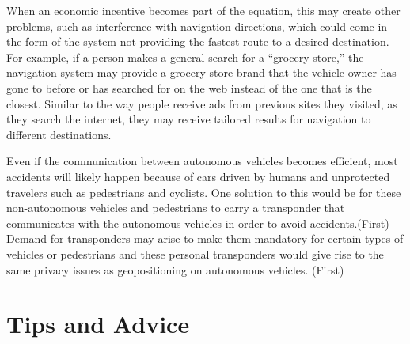 \documentclass[10pt,twocolumn]{article}
\begin{document}
When an economic incentive becomes part of the equation, this may create other problems, such as interference with navigation directions, which could come in the form of the system not providing the fastest route to a desired destination. For example, if a person makes a general search for a “grocery store,” the navigation system may provide a grocery store brand that the vehicle owner has gone to before or has searched for on the web instead of the one that is the closest. Similar to the way people receive ads from previous sites they visited, as they search the internet, they may receive tailored results for navigation to different destinations.

Even if the communication between autonomous vehicles becomes efficient, most accidents will likely happen because of  cars driven by humans and unprotected travelers such as pedestrians and cyclists. One solution to this would be for these non-autonomous vehicles and pedestrians to carry a transponder that communicates with the autonomous vehicles in order to avoid accidents.(First) Demand for transponders may arise to make them mandatory for certain types of vehicles or pedestrians and these personal transponders would give rise to the same privacy issues as geopositioning on autonomous vehicles. (First) 

\section{Tips and Advice}

\printbibliography 
\end{document}
